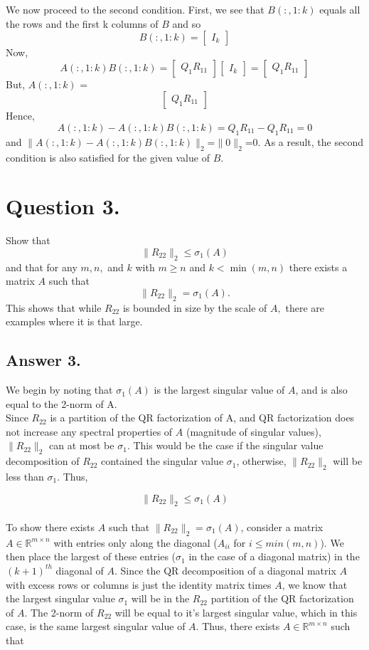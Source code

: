 \documentclass[12pt]{article}
\newcommand{\R}{\mathbb{R}}
\newcommand{\Rmn}{\R^{m\times n}}
\begin{document}
We now proceed to the second condition. First, we see that $B(:,1:k)$ equals all the rows and the first k columns of $B$ and so 
\[B(:,1:k)=\begin{bmatrix} I_k \end{bmatrix}\]
Now, \[A(:,1:k)B(:,1:k)=\begin{bmatrix} Q_1R_{11} \end{bmatrix}\begin{bmatrix} I_k \end{bmatrix}=\begin{bmatrix} Q_1R_{11} \end{bmatrix}\]
But, $A(:,1:k)$ = \[\begin{bmatrix} Q_1R_{11} \end{bmatrix}\]
Hence, \[A(:,1:k) - A(:,1:k)B(:,1:k)=Q_1R_{11} - Q_1R_{11} = 0\]
and $\|A(:,1:k) - A(:,1:k)B(:,1:k)\|_2$=$\|0\|_2$=0.
As a result, the second condition is also satisfied for the given value of $B$.

\section*{Question 3.}
Show that
\[
    \|R_{22}\|_2\leq \sigma_1(A)
\]
and that for any $m,n,$ and $k$ with $m\geq n$ and $k < \min(m,n)$ there exists a matrix $A$ such that
\[
    \|R_{22}\|_2 = \sigma_1(A).
\]
This shows that while $R_{22}$ is bounded in size by the scale of $A,$ there are examples where it is that large.

\subsection*{Answer 3.}

We begin by noting that $\sigma_1(A)$ is the largest singular value of $A$, and is also equal to the 2-norm of A. \\

Since $R_{22}$ is a partition of the QR factorization of A, and QR factorization does not increase any spectral properties of $A$ (magnitude of singular values), $\|R_{22}\|_2$ can at most be $\sigma_1$. This would be the case if the singular value decomposition of $R_{22}$ contained the singular value $\sigma_1$, otherwise,  $\|R_{22}\|_2$ will be less than $\sigma_1$. Thus,

$$\|R_{22}\|_2\leq \sigma_1(A)$$ \\

To show there exists $A$ such that $\|R_{22}\|_2 = \sigma_1(A)$, consider a matrix $A\in \Rmn$ with entries only along the diagonal ($A_{ii}$ for $i \leq min(m,n)$). We then place the largest of these entries ($\sigma_1$ in the case of a diagonal matrix) in the $(k+1)^{th}$ diagonal of $A$. Since the QR decomposition of a diagonal matrix $A$ with excess rows or columns is just the identity matrix times $A$, we know that the largest singular value $\sigma_1$ will be in the $R_{22}$ partition of the QR factorization of $A$. The 2-norm of $R_{22}$ will be equal to it's largest singular value, which in this case, is the same largest singular value of $A$. Thus, there exists $A \in \Rmn$ such that  
\end{document}
